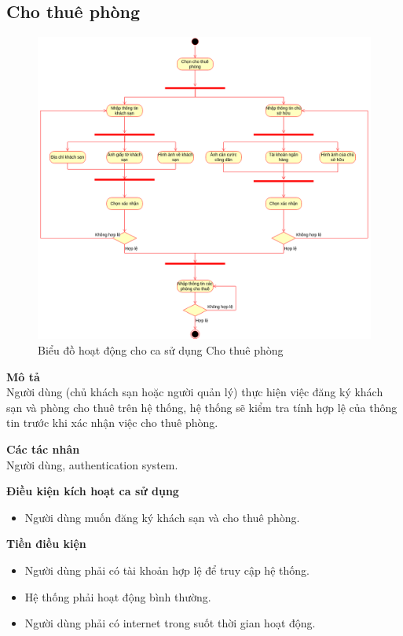 \subsection{Cho thuê phòng}
\begin{figure}[H]
    \centering
    \includegraphics[width=\textwidth]{img/1.Việt-Cho thuê phòng.drawio.png}
    \caption{Biểu đồ hoạt động cho ca sử dụng Cho thuê phòng}
\end{figure}
\textbf{\indent Mô tả}\\
\indent Người dùng (chủ khách sạn hoặc người quản lý) thực hiện việc đăng ký khách sạn và phòng cho thuê trên hệ thống, hệ thống sẽ kiểm tra tính hợp lệ của thông tin trước khi xác nhận việc cho thuê phòng.

\textbf{Các tác nhân}\\
\indent Người dùng, authentication system.

\textbf{Điều kiện kích hoạt ca sử dụng}
\begin{itemize}
    \item Người dùng muốn đăng ký khách sạn và cho thuê phòng.
\end{itemize}

\textbf{Tiền điều kiện}
\begin{itemize}
    \item Người dùng phải có tài khoản hợp lệ để truy cập hệ thống.
    \item Hệ thống phải hoạt động bình thường.
    \item Người dùng phải có internet trong suốt thời gian hoạt động.
\end{itemize}

